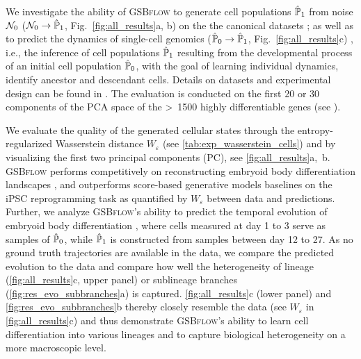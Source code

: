  We investigate the ability of \textsc{GSBflow} to generate cell populations $\hat{\mathbb{P}}_{ {1}}$ from noise $\mathcal{N}_0$ ($\mathcal{N}_0 \rightarrow \hat{\mathbb{P}}_{ {1}}$, Fig.~\ref{fig:all_results}a, b) on the the canonical datasets \citep{moon2019visualizing, schiebinger2019optimal}; as well as to predict the dynamics of single-cell genomics ($\hat{\mathbb{P}}_{ {0} } \rightarrow \hat{\mathbb{P}}_{ {1}}$, Fig.~\ref{fig:all_results}c) \citep{moon2019visualizing}, i.e., the inference of cell populations $\hat{\mathbb{P}}_{ {1}}$ resulting from the developmental process of an initial cell population $\hat{\mathbb{P}}_{ {0} }$, with the goal of learning individual dynamics, identify ancestor and descendant cells. Details on datasets and experimental design can be found in . %
The evaluation is conducted on the first 20 or 30 components of the PCA space of the >~1500 highly differentiable genes (see ).

 We evaluate the quality of the generated cellular states through the entropy-regularized Wasserstein distance $W_\varepsilon$
(see \cref{tab:exp_wasserstein_cells}) and by visualizing the first two principal components (PC), see \cref{fig:all_results}a,~b.
\textsc{GSBflow} performs competitively on reconstructing embryoid body differentiation landscapes \citep{moon2019visualizing}, and outperforms score-based generative models baselines on the iPSC reprogramming task \citep{schiebinger2019optimal} as quantified by $W_\varepsilon$ between data and predictions.
Further, we analyze \textsc{GSBflow}'s ability to predict the temporal evolution of embryoid body differentiation \citep{moon2019visualizing}, where cells measured at day 1 to 3 serve as samples of $\hat{\mathbb{P}}_{ {0} }$, while $\hat{\mathbb{P}}_{ {1}}$ is constructed from samples between day 12 to 27. As no ground truth trajectories are available in the data, we compare the predicted evolution to the data and compare how well the heterogeneity of lineage (\cref{fig:all_results}c, upper panel) or sublineage branches (\cref{fig:res_evo_subbranches}a) is captured.
\cref{fig:all_results}c (lower panel) and \cref{fig:res_evo_subbranches}b thereby closely resemble the data (see $W_\varepsilon$ in \cref{fig:all_results}c) and thus demonstrate \textsc{GSBflow}'s ability to learn cell differentiation into various lineages and to capture biological heterogeneity on a more macroscopic level.


